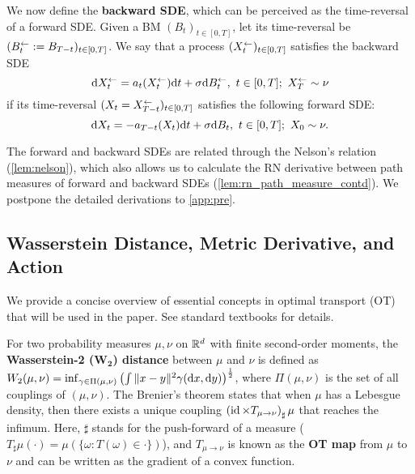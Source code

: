 We now define the \textbf{backward SDE}, which can be perceived as the time-reversal of a forward SDE. Given a BM $(B_t)_{t\in[0,T]}$, let its time-reversal be $(B^\gets_t:=B_{T-t})_{t\in[0,T]}$. We say that a process $(X^\gets_t)_{t\in[0,T]}$ satisfies the backward SDE
$$\mathrm{d}X^\gets_t=a_t(X^\gets_t)\mathrm{d} t+\sigma\mathrm{d}B^\gets_t,~t\in[0,T];~X^\gets_T\sim\nu$$
if its time-reversal $(X_t=X^\gets_{T-t})_{t\in[0,T]}$ satisfies the following forward SDE:
$$\mathrm{d} X_t=-a_{T-t}(X_t)\mathrm{d} t+\sigma\mathrm{d} B_t,~t\in[0,T];~X_0\sim\nu.$$

The forward and backward SDEs are related through the Nelson's relation (\cref{lem:nelson}), which also allows us to calculate the RN derivative between path measures of forward and backward SDEs (\cref{lem:rn_path_measure_contd}). We postpone the detailed derivations to \cref{app:pre}.

\subsection{Wasserstein Distance, Metric Derivative, and Action}
We provide a concise overview of essential concepts in optimal transport (OT) that will be used in the paper. See standard textbooks \citep{villani2021topics,villani2008optimal,ambrosio2008gradient,ambrosio2021lectures} for details. 

For two probability measures $\mu,\nu$ on $\mathbb{R}^d$ with finite second-order moments, the \textbf{Wasserstein-2 ($\textbf{W}_\textbf{2}$) distance} between $\mu$ and $\nu$ is defined as $W_2(\mu,\nu)=\inf_{\gamma\in\Pi(\mu,\nu)}\left(\int\|x-y\|^2\gamma(\mathrm{d} x,\mathrm{d} y)\right)^{\frac{1}{2}}$, where $\Pi(\mu,\nu)$ is the set of all couplings of $(\mu,\nu)$.
The Brenier's theorem states that when $\mu$ has a Lebesgue density, then there exists a unique coupling $\left(\operatorname{id}\times T_{\mu\to\nu}\right)_\sharp\mu$ that reaches the infimum. Here, $\sharp$ stands for the push-forward of a measure ($T_\sharp\mu(\cdot)=\mu(\{\omega:T(\omega)\in\cdot\})$), and $T_{\mu\to\nu}$ is known as the \textbf{OT map} from $\mu$ to $\nu$ and can be written as the gradient of a convex function.

